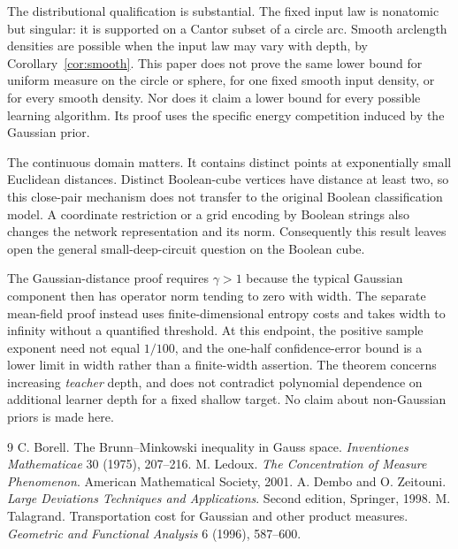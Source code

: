 \documentclass[11pt]{article}
\theoremstyle{remark}\newtheorem{remark}[theorem]{Remark}
\begin{document}
The distributional qualification is substantial. The fixed input law is
nonatomic but singular: it is supported on a Cantor subset of a circle
arc. Smooth arclength densities are possible when the input law may
vary with depth, by Corollary~\ref{cor:smooth}. This paper does not
prove the same lower bound for uniform measure on the circle or sphere,
for one fixed smooth input density, or for every smooth density. Nor does it
claim a lower bound for every possible learning algorithm. Its proof
uses the specific energy competition induced by the Gaussian prior.

The continuous domain matters. It contains distinct points at
exponentially small Euclidean distances. Distinct Boolean-cube vertices
have distance at least two, so this close-pair mechanism does not transfer
to the original Boolean classification model. A coordinate restriction
or a grid encoding by Boolean strings also changes the network
representation and its norm. Consequently this result leaves open the
general small-deep-circuit question on the Boolean cube.

The Gaussian-distance proof requires $\gamma>1$ because the typical
Gaussian component then has operator norm tending to zero with width.
The separate mean-field proof instead uses finite-dimensional entropy
costs and takes width to infinity without a quantified threshold.
At this endpoint, the positive sample exponent need not equal
$1/100$, and the one-half confidence-error bound is a lower limit
in width rather than a finite-width assertion.
The theorem concerns increasing \emph{teacher} depth, and does not
contradict polynomial dependence on additional learner depth for a fixed
shallow target. No claim about non-Gaussian priors is made here.

\begingroup\small
\begin{thebibliography}{9}
 C. Borell. The Brunn--Minkowski inequality in Gauss space.
\emph{Inventiones Mathematicae} 30 (1975), 207--216.
 M. Ledoux. \emph{The Concentration of Measure Phenomenon}.
American Mathematical Society, 2001.
 A. Dembo and O. Zeitouni.
\emph{Large Deviations Techniques and Applications}. Second edition,
Springer, 1998.
 M. Talagrand. Transportation cost for Gaussian
and other product measures. \emph{Geometric and Functional Analysis}
6 (1996), 587--600.
\end{thebibliography}\endgroup
\end{document}

